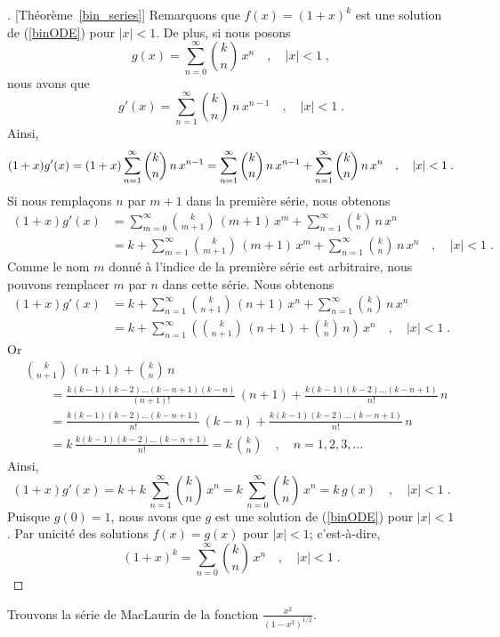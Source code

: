 {\begin{proof}[\theory][Théorème~\ref{bin_series}]
Remarquons que $f(x) = (1+x)^k$ est une solution de (\ref{binODE})
pour $|x|<1$.  De plus, si nous posons
\[
g(x) = \sum_{n=0}^\infty \binom{k}{n} \, x^n \quad , \quad |x|<1 \; ,
\]
nous avons que
\[
g'(x) = \sum_{n=1}^\infty \binom{k}{n}\,n \, x^{n-1}
\quad , \quad |x|<1 \; .
\]
Ainsi,
\[
(1+x) g'(x) = (1+x) \sum_{n=1}^\infty \binom{k}{n}\,n \, x^{n-1} \\
= \sum_{n=1}^\infty \binom{k}{n}\,n \, x^{n-1} +
\sum_{n=1}^\infty \binom{k}{n}\,n \, x^n \quad , \quad |x|<1 \; .
\]
Si nous remplaçons $n$ par $m+1$ dans la première série, nous obtenons
\begin{align*}
(1+x) g'(x)
&= \sum_{m=0}^\infty \binom{k}{m+1}\,(m+1) \, x^m +
\sum_{n=1}^\infty \binom{k}{n}\,n \, x^n \\
&= k + \sum_{m=1}^\infty \binom{k}{m+1}\,(m+1) \, x^m +
\sum_{n=1}^\infty \binom{k}{n}\,n \, x^n \quad , \quad |x|<1 \; .
\end{align*}
Comme le nom $m$ donné à l'indice de la première série est arbitraire, nous
pouvons remplacer $m$ par $n$ dans cette série.  Nous obtenons
\begin{align*}
(1+x) g'(x)
&= k + \sum_{n=1}^\infty \binom{k}{n+1}\,(n+1) \, x^n +
\sum_{n=1}^\infty \binom{k}{n}\,n \, x^n \\
&= k + \sum_{n=1}^\infty \left( \binom{k}{n+1}\,(n+1)
+ \binom{k}{n}\,n \right) \, x^n \quad , \quad |x|<1 \; .
\end{align*}
Or
\begin{align*}
& \binom{k}{n+1}\,(n+1) + \binom{k}{n}\,n \\
& \qquad = \frac{k(k-1)(k-2)\ldots(k-n+1)(k-n)}{(n+1)!} \, (n+1)
+ \frac{k(k-1)(k-2)\ldots(k-n+1)}{n!} \, n \\
& \qquad = \frac{k(k-1)(k-2)\ldots(k-n+1)}{n!} \, (k-n) +
\frac{k(k-1)(k-2)\ldots(k-n+1)}{n!} \, n \\
& \qquad = k\,\frac{k(k-1)(k-2)\ldots(k-n+1)}{n!} = k\, \binom{k}{n}
\quad , \quad n=1,2,3,\ldots
\end{align*}
Ainsi,
\[
(1+x) g'(x)
= k + k \,\sum_{n=1}^\infty \binom{k}{n} \, x^n
= k\, \sum_{n=0}^\infty \binom{k}{n} \, x^n
= k\, g(x) \quad , \quad |x|<1 \; .
\]
Puisque $g(0) =1$, nous avons que $g$ est une solution de (\ref{binODE}) pour
$|x|<1$.  Par unicité des solutions $f(x)=g(x)$ pour $|x|<1$; c'est-à-dire,
\[
(1+x)^k = \sum_{n=0}^\infty \binom{k}{n} \, x^n \quad , \quad |x|<1 
\; .
\]
\end{proof}

\begin{egg}
Trouvons la série de MacLaurin de la fonction
$\displaystyle \frac{x^2}{(1-x^3)^{1/2}}$.


\end{egg}}

